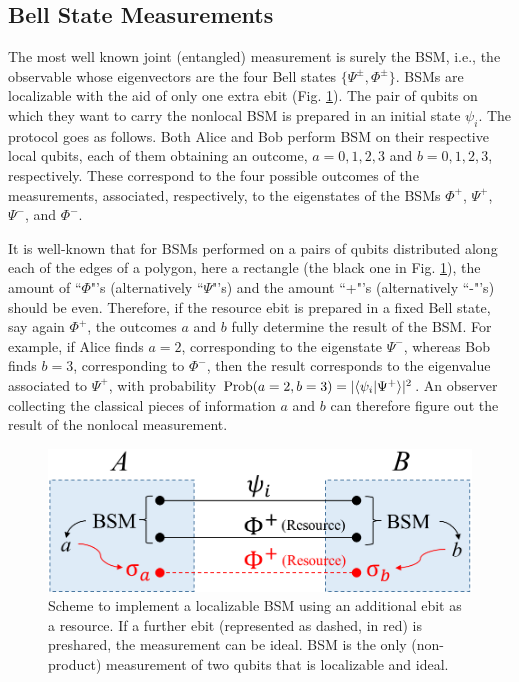 \documentclass[12pt]{article}
\newcommand{\braket}[2]{\langle {#1} \vphantom{#2} | {#2} \vphantom{#1} \rangle} %
\begin{document}
\subsection{Bell State Measurements}
\label{bsm}
The most well known joint (entangled) measurement is surely the BSM, i.e., the observable whose eigenvectors are the four Bell states $\{\Psi^\pm, \Phi^\pm \}$. BSMs are localizable with the aid of only one extra ebit (Fig. \ref{fig4}). The pair of qubits on which they want to carry the nonlocal BSM is prepared in an initial state $\psi_i$. The protocol goes as follows. Both Alice and Bob perform BSM on their respective local qubits, each of them obtaining an outcome, $a=0,1,2,3$ and $b=0,1,2,3$, respectively. These correspond to the four possible outcomes of the measurements, associated, respectively, to the eigenstates of the BSMs $\Phi^+$, $\Psi^+$, $\Psi^-$, and $\Phi^-$. 

It is well-known that for BSMs performed on a pairs of qubits distributed along each of the edges of a polygon, here a rectangle (the black one in Fig. \ref{fig4}), the amount of ``$\Phi$"'s (alternatively ``$\Psi$"'s) and the amount ``+"'s (alternatively ``-"'s) should be even. Therefore, if the resource ebit is prepared in a fixed Bell state, say again $\Phi^+$, the outcomes $a$ and $b$ fully determine the result of the BSM. For example, if Alice finds $a=2$, corresponding to the eigenstate $\Psi^-$, whereas Bob finds $b=3$, corresponding to $\Phi^-$, then the result corresponds to the eigenvalue associated to $\Psi^+$, with probability $\text{Prob}(a=2,b=3)=|\braket{\psi_i}{\Psi^+}|^2$. An observer collecting the classical pieces of information $a$ and $b$ can therefore figure out the result of the nonlocal measurement. 
 \begin{figure}[ht]
    \centering
    \includegraphics[width=.48\textwidth]{bsm.png}
    \caption{Scheme to implement a localizable BSM using an additional ebit as a resource. If a further ebit (represented as dashed, in red) is preshared, the measurement can be ideal. BSM is the only (non-product) measurement of two qubits that is localizable and ideal.}
    \label{fig4}
\end{figure}
\end{document}
